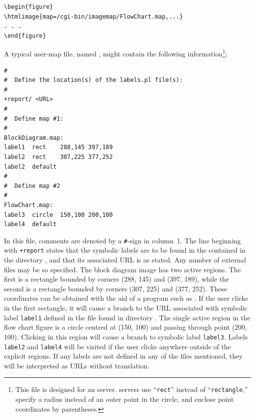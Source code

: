 \begin{small}
\begin{verbatim}
\begin{figure}
\htmlimage{map=/cgi-bin/imagemap/FlowChart.map,...}
. . .
\end{figure}
\end{verbatim}
\end{small}

\medskip\htmlrule[50\% center]
%
%
\html{\\}%
\noindent
A typical user-map file, named , 
might contain the following information\footnote{%
This file is designed for an  server.  
 servers use ``\texttt{rect}''
instead of ``\texttt{rectangle},'' 
specify a radius instead of an outer point in the circle, 
and enclose point coordinates by parentheses.}:
\begin{small}
\begin{verbatim}
#
#  Define the location(s) of the labels.pl file(s):
#
+report/ <URL>
#
#  Define map #1:
#
BlockDiagram.map:       
label1  rect    288,145 397,189
label2  rect    307,225 377,252
label2  default
#
#  Define map #2
#
FlowChart.map:
label3  circle  150,100 200,100
label4  default
\end{verbatim}
\end{small}
\html{\\}%
In this file, comments are denoted by a \texttt{\#}-sign in column~1.
The line beginning with \verb|+report| states that the symbolic labels
are to be found in the  contained in the directory
, and that its associated URL is as stated.  Any number
of external  files may be so specified.
The block diagram image has two active regions.  The first is a rectangle
bounded by corners (288, 145) and (397, 189), while the second is a rectangle
bounded by corners (307, 225) and (377, 252).  These coordinates
can be obtained with the aid of a program such as .
If the user clicks in the first rectangle, 
it will cause a branch to the URL associated
with symbolic label \texttt{label1} defined in the  file
found in directory .  The single active region in the
flow chart figure is a circle centred at (150, 100) and passing through
point (200, 100).  Clicking in this region will cause a branch to
symbolic label \texttt{label3}.  Labels \texttt{label2} and \texttt{label4}
will be visited if the user clicks anywhere outside of the explicit
regions.  If any labels are not defined in any of the 
files mentioned, they will be interpreted as URLs without translation.

